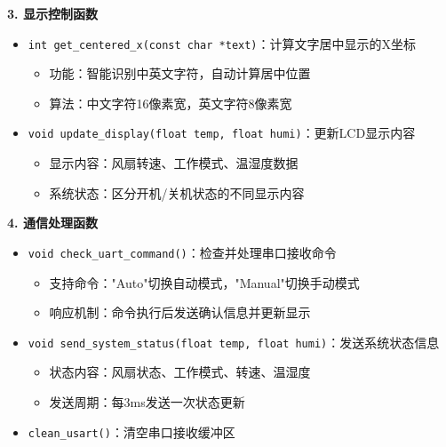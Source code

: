 \textbf{3. 显示控制函数}
\begin{itemize}
    \vspace{-6pt}
  \item \texttt{int get\_centered\_x(const char *text)}：计算文字居中显示的X坐标
    \begin{itemize}
        \vspace{-3pt}
      \item 功能：智能识别中英文字符，自动计算居中位置
        \vspace{-3pt}
      \item 算法：中文字符16像素宽，英文字符8像素宽
    \end{itemize}
    \vspace{-6pt}
  \item \texttt{void update\_display(float temp, float humi)}：更新LCD显示内容
    \begin{itemize}
        \vspace{-3pt}
      \item 显示内容：风扇转速、工作模式、温湿度数据
        \vspace{-3pt}
      \item 系统状态：区分开机/关机状态的不同显示内容
    \end{itemize}
\end{itemize}

\textbf{4. 通信处理函数}
\begin{itemize}
    \vspace{-6pt}
  \item \texttt{void check\_uart\_command()}：检查并处理串口接收命令
    \begin{itemize}
        \vspace{-3pt}
      \item 支持命令："Auto"切换自动模式，"Manual"切换手动模式
        \vspace{-3pt}
      \item 响应机制：命令执行后发送确认信息并更新显示
    \end{itemize}
    \vspace{-6pt}
  \item \texttt{void send\_system\_status(float temp, float humi)}：发送系统状态信息
    \begin{itemize}
        \vspace{-3pt}
      \item 状态内容：风扇状态、工作模式、转速、温湿度
        \vspace{-3pt}
      \item 发送周期：每3ms发送一次状态更新
    \end{itemize}
    \vspace{-6pt}
  \item \texttt{clean\_usart()}：清空串口接收缓冲区
\end{itemize}

